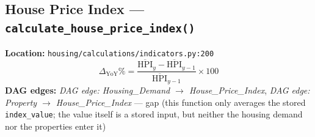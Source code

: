 \documentclass[11pt]{article}
\newcommand{\code}[1]{\texttt{#1}}
\newcommand{\dagedge}[1]{\textit{DAG edge: #1}}
\newcommand{\statusgap}{\textcolor{red!70!black}{gap}}
\begin{document}
\subsection{House Price Index --- \code{calculate\_house\_price\_index()}}
\textbf{Location:} \code{housing/calculations/indicators.py:200}
\begin{equation}
  \Delta_{\text{YoY}}\% = \frac{\overline{\text{HPI}}_{y} - \overline{\text{HPI}}_{y-1}}{\overline{\text{HPI}}_{y-1}} \times 100
\end{equation}
\textbf{DAG edges:} \dagedge{Housing\_Demand $\rightarrow$ House\_Price\_Index}, \dagedge{Property $\rightarrow$ House\_Price\_Index} --- \statusgap{} (this function only averages the stored \code{index\_value}; the value itself is a stored input, but neither the housing demand nor the properties enter it)
\end{document}
